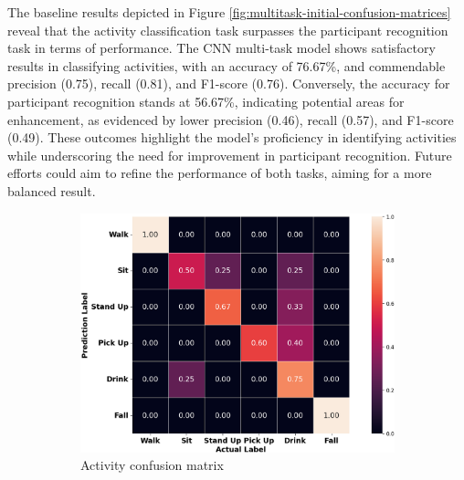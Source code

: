 \documentclass{l4proj}
\begin{document}
The baseline results depicted in Figure \ref{fig:multitask-initial-confusion-matrices} reveal that the activity classification task surpasses the participant recognition task in terms of performance. The CNN multi-task model shows satisfactory results in classifying activities, with an accuracy of 76.67\%, and commendable precision (0.75), recall (0.81), and F1-score (0.76). Conversely, the accuracy for participant recognition stands at 56.67\%, indicating potential areas for enhancement, as evidenced by lower precision (0.46), recall (0.57), and F1-score (0.49). These outcomes highlight the model's proficiency in identifying activities while underscoring the need for improvement in participant recognition. Future efforts could aim to refine the performance of both tasks, aiming for a more balanced result.

\begin{figure}[h]
   \centering
   \begin{subfigure}{0.49\textwidth}
        \includegraphics[width=\textwidth]{images/multitask-activity-initial-test-confusion-matrix.png}
        \caption{Activity confusion matrix}
        \label{fig:multitask-activity-initial-test-confusion-matrix}
    \end{subfigure}
    \qquad
    \begin{subfigure}{0.45\textwidth}

\end{subfigure}
\end{figure}
\end{document}

